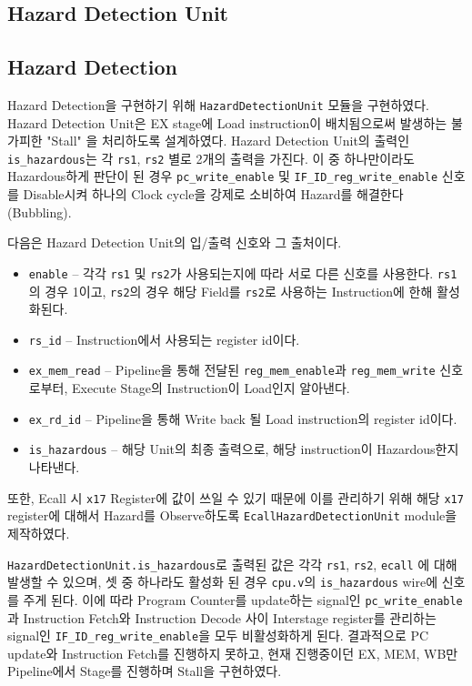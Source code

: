 \documentclass{scrartcl}
\begin{document}
\subsection{Hazard Detection Unit}

\subsection{Hazard Detection}
Hazard Detection을 구현하기 위해 \texttt{HazardDetectionUnit} 모듈을 구현하였다. Hazard Detection Unit은 EX stage에 Load instruction이 배치됨으로써 발생하는 불가피한 "Stall" 을 처리하도록 설계하였다.
Hazard Detection Unit의 출력인 \texttt{is\_hazardous}는 각 \texttt{rs1}, \texttt{rs2} 별로 2개의 출력을 가진다.
이 중 하나만이라도 Hazardous하게 판단이 된 경우 \texttt{pc\_write\_enable} 및 \texttt{IF\_ID\_reg\_write\_enable} 신호를 Disable시켜 하나의 Clock cycle을 강제로 소비하여 Hazard를 해결한다 (Bubbling).

다음은 Hazard Detection Unit의 입/출력 신호와 그 출처이다.
\begin{itemize}
  \item \texttt{enable} -- 각각 \texttt{rs1} 및 \texttt{rs2}가 사용되는지에 따라 서로 다른 신호를 사용한다. \texttt{rs1}의 경우 1이고, \texttt{rs2}의 경우 해당 Field를 \texttt{rs2}로 사용하는 Instruction에 한해 활성화된다.
  \item \texttt{rs\_id} -- Instruction에서 사용되는 register id이다.
  \item \texttt{ex\_mem\_read} -- Pipeline을 통해 전달된 \texttt{reg\_mem\_enable}과 \texttt{reg\_mem\_write} 신호로부터, Execute Stage의 Instruction이 Load인지 알아낸다.
  \item \texttt{ex\_rd\_id} -- Pipeline을 통해 Write back 될 Load instruction의 register id이다.
  \item \texttt{is\_hazardous} -- 해당 Unit의 최종 출력으로, 해당 instruction이 Hazardous한지 나타낸다.
\end{itemize}

또한, Ecall 시 \texttt{x17} Register에 값이 쓰일 수 있기 때문에 이를 관리하기 위해 해당 \texttt{x17} register에 대해서 Hazard를 Observe하도록 \texttt{EcallHazardDetectionUnit} module을 제작하였다.

\texttt{HazardDetectionUnit.is\_hazardous}로 출력된 값은 각각 \texttt{rs1}, \texttt{rs2}, \texttt{ecall} 에 대해 발생할 수 있으며, 셋 중 하나라도 활성화 된 경우 \texttt{cpu.v}의 \texttt{is\_hazardous} wire에 신호를 주게 된다.
이에 따라 Program Counter를 update하는 signal인 \texttt{pc\_write\_enable}과 Instruction Fetch와 Instruction Decode 사이 Interstage register를 관리하는 signal인 \texttt{IF\_ID\_reg\_write\_enable}을 모두 비활성화하게 된다.
결과적으로 PC update와 Instruction Fetch를 진행하지 못하고, 현재 진행중이던 EX, MEM, WB만 Pipeline에서 Stage를 진행하며 Stall을 구현하였다.
\end{document}
